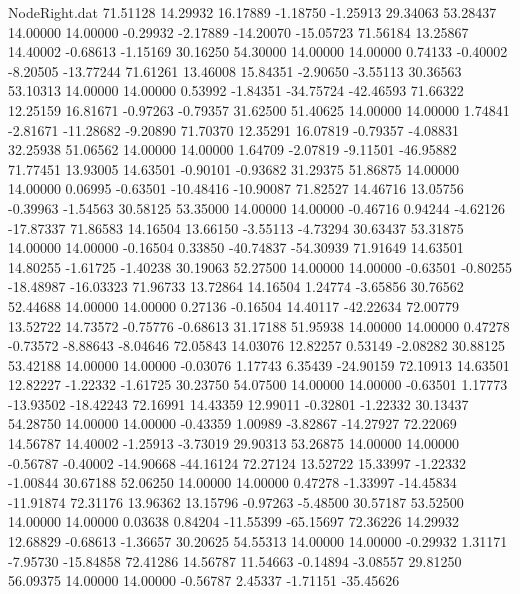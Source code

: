 \begin{filecontents}{NodeRight.dat}
  71.51128   14.29932   16.17889    -1.18750   -1.25913   29.34063   53.28437   14.00000   14.00000   -0.29932   -2.17889  -14.20070  -15.05723
  71.56184   13.25867   14.40002    -0.68613   -1.15169   30.16250   54.30000   14.00000   14.00000    0.74133   -0.40002   -8.20505  -13.77244
  71.61261   13.46008   15.84351    -2.90650   -3.55113   30.36563   53.10313   14.00000   14.00000    0.53992   -1.84351  -34.75724  -42.46593
  71.66322   12.25159   16.81671    -0.97263   -0.79357   31.62500   51.40625   14.00000   14.00000    1.74841   -2.81671  -11.28682   -9.20890
  71.70370   12.35291   16.07819    -0.79357   -4.08831   32.25938   51.06562   14.00000   14.00000    1.64709   -2.07819   -9.11501  -46.95882
  71.77451   13.93005   14.63501    -0.90101   -0.93682   31.29375   51.86875   14.00000   14.00000    0.06995   -0.63501  -10.48416  -10.90087
  71.82527   14.46716   13.05756    -0.39963   -1.54563   30.58125   53.35000   14.00000   14.00000   -0.46716    0.94244   -4.62126  -17.87337
  71.86583   14.16504   13.66150    -3.55113   -4.73294   30.63437   53.31875   14.00000   14.00000   -0.16504    0.33850  -40.74837  -54.30939
  71.91649   14.63501   14.80255    -1.61725   -1.40238   30.19063   52.27500   14.00000   14.00000   -0.63501   -0.80255  -18.48987  -16.03323
  71.96733   13.72864   14.16504     1.24774   -3.65856   30.76562   52.44688   14.00000   14.00000    0.27136   -0.16504   14.40117  -42.22634
  72.00779   13.52722   14.73572    -0.75776   -0.68613   31.17188   51.95938   14.00000   14.00000    0.47278   -0.73572   -8.88643   -8.04646
  72.05843   14.03076   12.82257     0.53149   -2.08282   30.88125   53.42188   14.00000   14.00000   -0.03076    1.17743    6.35439  -24.90159
  72.10913   14.63501   12.82227    -1.22332   -1.61725   30.23750   54.07500   14.00000   14.00000   -0.63501    1.17773  -13.93502  -18.42243
  72.16991   14.43359   12.99011    -0.32801   -1.22332   30.13437   54.28750   14.00000   14.00000   -0.43359    1.00989   -3.82867  -14.27927
  72.22069   14.56787   14.40002    -1.25913   -3.73019   29.90313   53.26875   14.00000   14.00000   -0.56787   -0.40002  -14.90668  -44.16124
  72.27124   13.52722   15.33997    -1.22332   -1.00844   30.67188   52.06250   14.00000   14.00000    0.47278   -1.33997  -14.45834  -11.91874
  72.31176   13.96362   13.15796    -0.97263   -5.48500   30.57187   53.52500   14.00000   14.00000    0.03638    0.84204  -11.55399  -65.15697
  72.36226   14.29932   12.68829    -0.68613   -1.36657   30.20625   54.55313   14.00000   14.00000   -0.29932    1.31171   -7.95730  -15.84858
  72.41286   14.56787   11.54663    -0.14894   -3.08557   29.81250   56.09375   14.00000   14.00000   -0.56787    2.45337   -1.71151  -35.45626

\end{filecontents}
